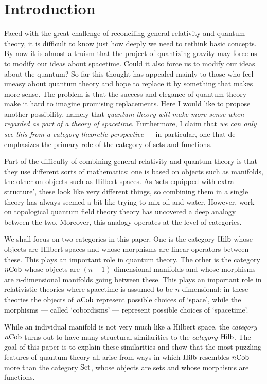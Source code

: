 \documentclass{article}
\newcommand{\Set}{{\rm Set}}
\newcommand{\Hilb}{{\rm Hilb}}
\newcommand{\Cob}{{\rm Cob}}
\begin{document}
\section{Introduction}

Faced with the great challenge of reconciling general relativity and quantum 
theory, it is difficult to know just how deeply we need to rethink basic 
concepts. By now it is almost a truism that the project of quantizing gravity 
may force us to modify our ideas about spacetime.  Could it also force us 
to modify our ideas about the quantum?  So far this thought has appealed 
mainly to those who feel uneasy about quantum theory and hope to replace 
it by something that makes more sense.  The problem is that the success 
and elegance of quantum theory make it hard to imagine promising
replacements.  Here I would like to propose another possibility, namely 
that {\it quantum theory will make more sense when regarded as part of 
a theory of spacetime}.  Furthermore, I claim that {\it we can only see 
this from a category-theoretic perspective} --- in particular, one that 
de-emphasizes the primary role of the category of sets and functions.   

Part of the difficulty of combining general relativity and quantum theory is
that they use different sorts of mathematics: one is based on objects 
such as manifolds, the other on objects such as Hilbert spaces.  As 
`sets equipped with extra structure', these look like very different 
things, so combining them in a single theory has always seemed a bit 
like trying to mix oil and water.  However, work on topological quantum 
field theory theory has uncovered a deep analogy between the two.  
Moreover, this analogy operates at the level of categories.  

We shall focus on two categories in this paper.  One is the category 
$\Hilb$ whose objects are Hilbert spaces and whose 
morphisms are linear operators between these.  This plays an important 
role in quantum theory.  The other is the category $n\Cob$ whose objects
are $(n-1)$-dimensional manifolds and whose morphisms are $n$-dimensional 
manifolds going between these.  This plays an important role in 
relativistic theories where spacetime is assumed to be $n$-dimensional:
in these theories the objects of $n\Cob$ represent possible choices of 
`space', while the morphisms --- called `cobordisms' --- represent 
possible choices of `spacetime'.

While an individual manifold is not very much like a Hilbert space,
the {\it category} $n\Cob$ turns out to have many structural
similarities to the {\it category} $\Hilb$.  The goal of this paper is
to explain these similarities and show that the most puzzling features
of quantum theory all arise from ways in which $\Hilb$ resembles
$n\Cob$ more than the category $\Set$, whose objects are sets and
whose morphisms are functions.
\end{document}
